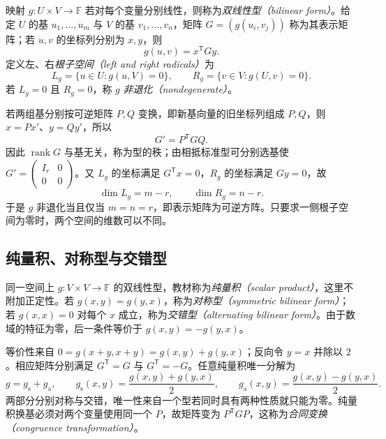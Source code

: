 \begin{definition}
\label{def:laex-bilinear}
映射 $g:U\times V\to\mathbb F$ 若对每个变量分别线性，则称为\emph{双线性型（bilinear form）}。给定 $U$ 的基 $u_1,\ldots,u_m$ 与 $V$ 的基 $v_1,\ldots,v_n$，矩阵 $G=(g(u_i,v_j))$ 称为其表示矩阵；若 $u,v$ 的坐标列分别为 $x,y$，则
\begin{equation}
 g(u,v)=x^{\mathsf T}Gy.
 \label{eq:laex-bilinear-matrix}
\end{equation}
定义左、右\emph{根子空间（left and right radicals）}为
\[
 L_g=\{u\in U:g(u,V)=0\},\qquad
 R_g=\{v\in V:g(U,v)=0\}.
\]
若 $L_g=0$ 且 $R_g=0$，称 $g$ \emph{非退化（nondegenerate）}。
\end{definition}

若两组基分别按可逆矩阵 $P,Q$ 变换，即新基向量的旧坐标列组成 $P,Q$，则 $x=Px'$、$y=Qy'$，所以
\begin{equation}
 G'=P^{\mathsf T}GQ.
 \label{eq:laex-bilinear-change}
\end{equation}
因此 $\operatorname{rank}G$ 与基无关，称为型的秩；由相抵标准型可分别选基使 $G'=\begin{pmatrix}I_r&0\\0&0\end{pmatrix}$。又 $L_g$ 的坐标满足 $G^{\mathsf T}x=0$，$R_g$ 的坐标满足 $Gy=0$，故
\begin{equation}
 \dim L_g=m-r,\qquad \dim R_g=n-r.
 \label{eq:laex-radical-dimensions}
\end{equation}
于是 $g$ 非退化当且仅当 $m=n=r$，即表示矩阵为可逆方阵。只要求一侧根子空间为零时，两个空间的维数可以不同。

\subsection{纯量积、对称型与交错型}

\begin{definition}
\label{def:laex-scalar-form}
同一空间上 $g:V\times V\to\mathbb F$ 的双线性型，教材称为\emph{纯量积（scalar product）}，这里不附加正定性。若 $g(x,y)=g(y,x)$，称为\emph{对称型（symmetric bilinear form）}；若 $g(x,x)=0$ 对每个 $x$ 成立，称为\emph{交错型（alternating bilinear form）}。由于数域的特征为零，后一条件等价于 $g(x,y)=-g(y,x)$。
\end{definition}

等价性来自 $0=g(x+y,x+y)=g(x,y)+g(y,x)$；反向令 $y=x$ 并除以 $2$。相应矩阵分别满足 $G^{\mathsf T}=G$ 与 $G^{\mathsf T}=-G$。任意纯量积唯一分解为
\begin{equation}
 g=g_{\mathrm s}+g_{\mathrm a},\qquad
 g_{\mathrm s}(x,y)=\frac{g(x,y)+g(y,x)}2,\qquad
 g_{\mathrm a}(x,y)=\frac{g(x,y)-g(y,x)}2.
 \label{eq:laex-form-split}
\end{equation}
两部分分别对称与交错，唯一性来自一个型若同时具有两种性质就只能为零。纯量积换基必须对两个变量使用同一个 $P$，故矩阵变为 $P^{\mathsf T}GP$，这称为\emph{合同变换（congruence transformation）}。

